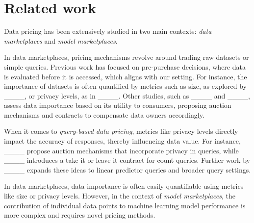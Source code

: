 \section{Related work}
Data pricing has been extensively studied in two main contexts: {\em data marketplaces} and {\em model marketplaces}. %


In data marketplaces, pricing mechanisms revolve around trading raw datasets or simple queries. Previous work has focused on pre-purchase decisions, where data is evaluated before it is accessed, which aligns with our setting. For instance, the importance of datasets is often quantified by metrics such as size, as explored by ____, or privacy levels, as in ____. Other studies, such as ____ and ____, assess data importance based on its utility to consumers, proposing auction mechanisms and contracts to compensate data owners accordingly.

When it comes to \emph{query-based data pricing}, metrics like privacy levels directly impact the accuracy of responses, thereby influencing data value.
For instance, ____ propose auction mechanisms that incorporate privacy in queries, while ____ introduces a take-it-or-leave-it contract for count queries. Further work by ____ expands these ideas to linear predictor queries and broader query settings.

In data marketplaces, data importance is often easily quantifiable using metrics like size or privacy levels. However, in the context of \emph{model marketplaces}, the contribution of individual data points to machine learning model performance is more complex and requires novel pricing methods.


